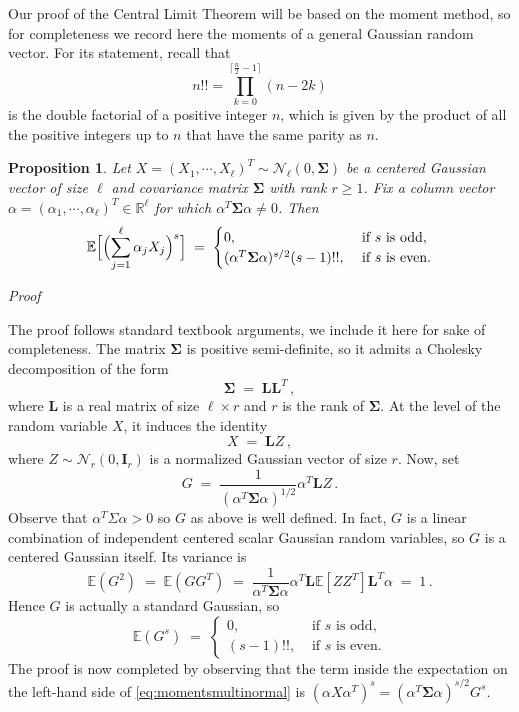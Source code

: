 \documentclass[reqno,a4paper,11pt]{amsart}
\makeatletter
\newtheorem{proposition}[lemma]{Proposition}
\theoremstyle{remark}
\numberwithin{equation}{section}
\renewenvironment{proof}[1][Proof]{\par
\pushQED{\qed}%
\normalfont \topsep6\p@\@plus6\p@\relax
\trivlist
\item\relax
{\itshape
#1\@addpunct{.}}\hspace\labelsep\ignorespaces
}{%
\popQED\endtrivlist\@endpefalse
}
\makeatother
\begin{document}
Our proof of the Central Limit Theorem will be based on the moment method, so for completeness we record here the moments of a general Gaussian random vector. For its statement, recall that
%
$$
n!! = \prod_{k=0}^{\lceil \frac{n}{2}-1\rceil}(n-2k)
$$
%
is the double factorial of a positive integer $n$, which is given by the product of all the positive integers up to $n$ that have the same parity as $n$.

\begin{proposition}
\label{prop:momentsmultinormal}
Let $X=(X_1,\cdots,X_\ell)^T\sim \mathcal N_{\ell}(0,\bm\Sigma)$ be a centered
Gaussian vector of size $\ell$ and covariance matrix $\bm \Sigma$ with rank
$r\geq 1$. Fix a column vector $\alpha=(\alpha_1,\cdots,\alpha_\ell)^T\in
\mathbb R^\ell$ for which $\alpha^T\bm \Sigma\alpha\neq 0$. Then
%
\begin{equation}\label{eq:momentsmultinormal}
\mathbb E\Bigl[ \Bigl(\sum_{j=1}^{\ell}\alpha_j X_j\Bigr)^{s}\Bigr]\;=\;
\begin{cases}
0, & \text{ if }s \text{ is odd}, \\
(\alpha^T \bm \Sigma \alpha)^{s/2} (s-1)!!, & \text{ if } s \text{ is even}.
\end{cases}
\end{equation}
\end{proposition}

\begin{proof}
The proof follows standard textbook arguments, we include it here for sake of completeness.
The matrix $\bm \Sigma$ is positive semi-definite, so it admits a Cholesky decomposition of the form
%
$$
\bm \Sigma\;=\;\bm L\bm L^T\,,
$$
%
where $\bm L$ is a real matrix of size $\ell\times r$ and $r$ is the rank of $\bm \Sigma$. At the level of the random variable $X$, it induces the identity
%
$$
X\;=\;\bm LZ\,,
$$
%
where $Z\sim \mathcal N_r(0,\bm I_r)$ is a normalized Gaussian vector of size $r$.
Now, set
%
$$
G\;=\;\frac{1}{(\alpha^T\bm\Sigma \alpha)^{1/2}} \alpha^T\bm L Z\,.
$$
%
Observe that $\alpha^T\Sigma \alpha>0$ so $G$ as above is well defined. In fact, $G$ is a linear combination of independent centered scalar Gaussian random variables, so $G$ is a centered Gaussian itself. Its variance is
%
$$
\mathbb E(G^2)\;=\;\mathbb E(GG^T)\;=\;\frac{1}{\alpha^T\bm \Sigma \alpha}\alpha^T\bm L\mathbb E[ZZ^T]\bm L^T\alpha\;=\;1\,.
$$
%
Hence $G$ is actually a standard Gaussian, so
%
$$
\mathbb E(G^s)\;=\;
\begin{cases}
0, & \text{ if }s \text{ is odd}, \\
(s-1)!!, & \text{ if } s \text{ is even}.
\end{cases}
$$
%
The proof is now completed by observing that the term inside the expectation on
    the left-hand side of \eqref{eq:momentsmultinormal} is $\left(\alpha
    X\alpha^T\right)^s =(\alpha^T \bm \Sigma \alpha)^{s/2} G^s.$
\end{proof}
\end{document}
